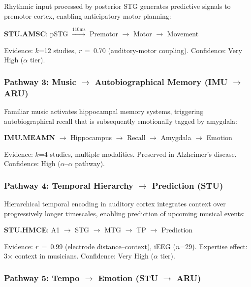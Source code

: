 \documentclass[9pt,onecolumn]{article}
\newcommand{\STU}{\textcolor{stucolor}{\textbf{STU}}}
\newcommand{\IMU}{\textcolor{imucolor}{\textbf{IMU}}}
\newcommand{\ARU}{\textcolor{arucolor}{\textbf{ARU}}}
\newcommand{\correlation}[1]{\textit{r}~=~#1}
\begin{document}
Rhythmic input processed by posterior STG generates predictive signals to premotor cortex, enabling anticipatory motor planning:

\begin{center}
\small
\textbf{STU.AMSC}: pSTG $\xrightarrow{110\text{ms}}$ Premotor $\rightarrow$ Motor $\rightarrow$ Movement
\end{center}

Evidence: $k$=12 studies, \correlation{0.70} (auditory-motor coupling). Confidence: Very High ($\alpha$ tier).

\subsubsection{Pathway 3: Music $\rightarrow$ Autobiographical Memory (\IMU{} $\rightarrow$ \ARU{})}

Familiar music activates hippocampal memory systems, triggering autobiographical recall that is subsequently emotionally tagged by amygdala:

\begin{center}
\small
\textbf{IMU.MEAMN} $\rightarrow$ Hippocampus $\rightarrow$ Recall $\rightarrow$ Amygdala $\rightarrow$ Emotion
\end{center}

Evidence: $k$=4 studies, multiple modalities. Preserved in Alzheimer's disease. Confidence: High ($\alpha$--$\alpha$ pathway).

\subsubsection{Pathway 4: Temporal Hierarchy $\rightarrow$ Prediction (\STU{})}

Hierarchical temporal encoding in auditory cortex integrates context over progressively longer timescales, enabling prediction of upcoming musical events:

\begin{center}
\small
\textbf{STU.HMCE}: A1 $\rightarrow$ STG $\rightarrow$ MTG $\rightarrow$ TP $\rightarrow$ Prediction
\end{center}

Evidence: \correlation{0.99} (electrode distance--context), iEEG ($n$=29). Expertise effect: 3$\times$ context in musicians. Confidence: Very High ($\alpha$ tier).

\subsubsection{Pathway 5: Tempo $\rightarrow$ Emotion (\STU{} $\rightarrow$ \ARU{})}
\end{document}
